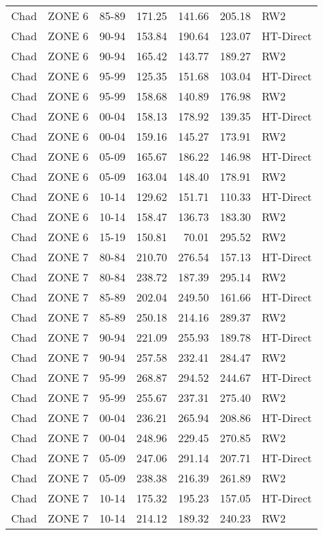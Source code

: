 \begin{longtable}{lllrrrl}
  Chad & ZONE 6 & 85-89 & 171.25 & 141.66 & 205.18 & RW2 \\ 
  Chad & ZONE 6 & 90-94 & 153.84 & 190.64 & 123.07 & HT-Direct \\ 
  Chad & ZONE 6 & 90-94 & 165.42 & 143.77 & 189.27 & RW2 \\ 
  Chad & ZONE 6 & 95-99 & 125.35 & 151.68 & 103.04 & HT-Direct \\ 
  Chad & ZONE 6 & 95-99 & 158.68 & 140.89 & 176.98 & RW2 \\ 
  Chad & ZONE 6 & 00-04 & 158.13 & 178.92 & 139.35 & HT-Direct \\ 
  Chad & ZONE 6 & 00-04 & 159.16 & 145.27 & 173.91 & RW2 \\ 
  Chad & ZONE 6 & 05-09 & 165.67 & 186.22 & 146.98 & HT-Direct \\ 
  Chad & ZONE 6 & 05-09 & 163.04 & 148.40 & 178.91 & RW2 \\ 
  Chad & ZONE 6 & 10-14 & 129.62 & 151.71 & 110.33 & HT-Direct \\ 
  Chad & ZONE 6 & 10-14 & 158.47 & 136.73 & 183.30 & RW2 \\ 
  Chad & ZONE 6 & 15-19 & 150.81 & 70.01 & 295.52 & RW2 \\ 
  Chad & ZONE 7 & 80-84 & 210.70 & 276.54 & 157.13 & HT-Direct \\ 
  Chad & ZONE 7 & 80-84 & 238.72 & 187.39 & 295.14 & RW2 \\ 
  Chad & ZONE 7 & 85-89 & 202.04 & 249.50 & 161.66 & HT-Direct \\ 
  Chad & ZONE 7 & 85-89 & 250.18 & 214.16 & 289.37 & RW2 \\ 
  Chad & ZONE 7 & 90-94 & 221.09 & 255.93 & 189.78 & HT-Direct \\ 
  Chad & ZONE 7 & 90-94 & 257.58 & 232.41 & 284.47 & RW2 \\ 
  Chad & ZONE 7 & 95-99 & 268.87 & 294.52 & 244.67 & HT-Direct \\ 
  Chad & ZONE 7 & 95-99 & 255.67 & 237.31 & 275.40 & RW2 \\ 
  Chad & ZONE 7 & 00-04 & 236.21 & 265.94 & 208.86 & HT-Direct \\ 
  Chad & ZONE 7 & 00-04 & 248.96 & 229.45 & 270.85 & RW2 \\ 
  Chad & ZONE 7 & 05-09 & 247.06 & 291.14 & 207.71 & HT-Direct \\ 
  Chad & ZONE 7 & 05-09 & 238.38 & 216.39 & 261.89 & RW2 \\ 
  Chad & ZONE 7 & 10-14 & 175.32 & 195.23 & 157.05 & HT-Direct \\ 
  Chad & ZONE 7 & 10-14 & 214.12 & 189.32 & 240.23 & RW2 \\ 

\end{longtable}
